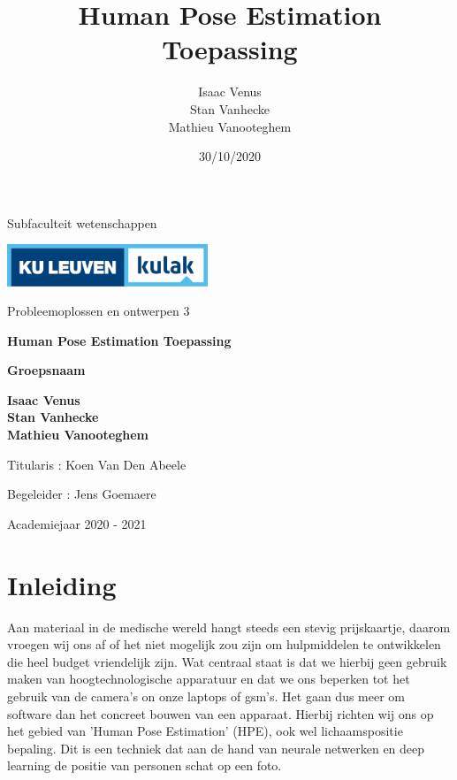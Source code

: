 \documentclass{article}
\title{Human Pose Estimation Toepassing
                                              }
\author{Isaac Venus\\
Stan Vanhecke\\
Mathieu Vanooteghem}
\date{30/10/2020}
\begin{document}
\pagestyle{empty}

\begin{center}
	{{\Large Subfaculteit wetenschappen}
	
	\vspace{1cm}
	
	\includegraphics[width=6cm]{2013-kulak-cmyk-highres.jpg}
	
	\vspace{1cm}
	
	\Large Probleemoplossen en ontwerpen 3}
	
	\vspace{2cm}

	{\Huge \textbf{Human Pose Estimation Toepassing}}
	
	\vspace{1cm}
	
	{\Large \textbf{Groepsnaam}}
	
	\vspace{1cm}
	
	{\Large \textbf{Isaac Venus}}\\
	{\Large \textbf{Stan Vanhecke}}\\
	{\Large \textbf{Mathieu Vanooteghem}}\\

\end{center}

\vspace{2cm}
{\Large Titularis : Koen Van Den Abeele}
\vspace{1cm}

{\Large Begeleider : Jens Goemaere}


\vspace{1cm}

\begin{center}
	{\Large Academiejaar 2020 - 2021}
\end{center}

\section*{Inleiding}
Aan materiaal in de medische wereld hangt steeds een stevig prijskaartje, daarom vroegen wij ons af of het niet mogelijk zou zijn om hulpmiddelen te ontwikkelen die heel budget vriendelijk zijn. Wat centraal staat is dat we hierbij geen gebruik maken van hoogtechnologische apparatuur en dat we ons beperken tot het gebruik van de camera's on onze laptops of gsm's. Het gaan dus meer om software dan het concreet bouwen van een apparaat. Hierbij richten wij ons op het gebied van 'Human Pose Estimation' (HPE), ook wel lichaamspositie bepaling. Dit is een techniek dat aan de hand van neurale netwerken en deep learning de positie van personen schat op een foto.
\end{document}
